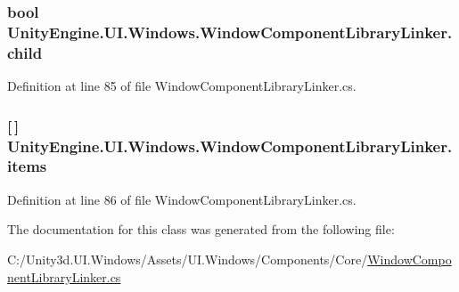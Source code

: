 \subsubsection[{child}]{\setlength{\rightskip}{0pt plus 5cm}bool Unity\+Engine.\+U\+I.\+Windows.\+Window\+Component\+Library\+Linker.\+child}\label{class_unity_engine_1_1_u_i_1_1_windows_1_1_window_component_library_linker_a95f95fd76409ae74d67331a6a7848d7d}


Definition at line 85 of file Window\+Component\+Library\+Linker.\+cs.

\hypertarget{class_unity_engine_1_1_u_i_1_1_windows_1_1_window_component_library_linker_a3b61b1349902353bf84556af25ba25cc}{}
\subsubsection[{items}]{ \mbox{[}$\,$\mbox{]} Unity\+Engine.\+U\+I.\+Windows.\+Window\+Component\+Library\+Linker.\+items}\label{class_unity_engine_1_1_u_i_1_1_windows_1_1_window_component_library_linker_a3b61b1349902353bf84556af25ba25cc}


Definition at line 86 of file Window\+Component\+Library\+Linker.\+cs.



The documentation for this class was generated from the following file\+:\begin{DoxyCompactItemize}
\item 
C\+:/\+Unity3d.\+U\+I.\+Windows/\+Assets/\+U\+I.\+Windows/\+Components/\+Core/\hyperlink{_window_component_library_linker_8cs}{Window\+Component\+Library\+Linker.\+cs}\end{DoxyCompactItemize}
